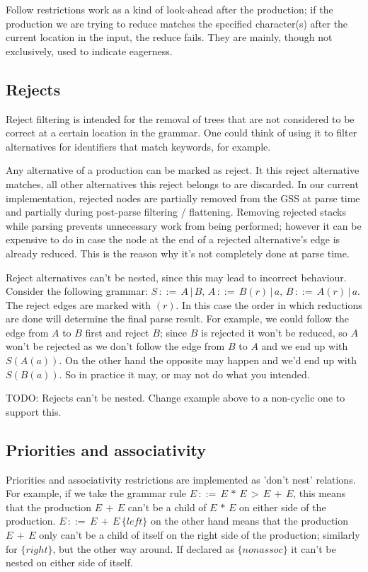 \documentclass[a4paper,10pt]{article}
\begin{document}
Follow restrictions work as a kind of look-ahead after the production; if the production we are trying to reduce matches the specified character(s) after the current location in the input, the reduce fails. They are mainly, though not exclusively, used to indicate eagerness.

\subsection{Rejects}

Reject filtering is intended for the removal of trees that are not considered to be correct at a certain location in the grammar. One could think of using it to filter alternatives for identifiers that match keywords, for example.

Any alternative of a production can be marked as reject. It this reject alternative matches, all other alternatives this reject belongs to are discarded. In our current implementation, rejected nodes are partially removed from the GSS at parse time and partially during post-parse filtering / flattening. Removing rejected stacks while parsing prevents unnecessary work from being performed; however it can be expensive to do in case the node at the end of a rejected alternative's edge is already reduced. This is the reason why it's not completely done at parse time.

Reject alternatives can't be nested, since this may lead to incorrect behaviour. Consider the following grammar: $S\,::=\,A\,|\,B,\,A\,::=\,B(r)\,|\,a,\,B\,::=\,A(r)\,|\,a$. The reject edges are marked with $(r)$. In this case the order in which reductions are done will determine the final parse result. For example, we could follow the edge from $A$ to $B$ first and reject $B$; since $B$ is rejected it won't be reduced, so $A$ won't be rejected as we don't follow the edge from $B$ to $A$ and we end up with $S(A(a))$. On the other hand the opposite may happen and we'd end up with $S(B(a))$. So in practice it may, or may not do what you intended.

TODO: Rejects can't be nested. Change example above to a non-cyclic one to support this.

\subsection{Priorities and associativity}

Priorities and associativity restrictions are implemented as 'don't nest' relations. For example, if we take the grammar rule $E\,::=\,E\,*\,E\,>\,E\,+\,E$, this means that the production $E\,+\,E$ can't be a child of $E\,*\,E$ on either side of the production. $E\,::=\,E\,+\,E\,\{left\}$ on the other hand means that the production $E\,+\,E$ only can't be a child of itself on the right side of the production; similarly for $\{right\}$, but the other way around. If declared as $\{nonassoc\}$ it can't be nested on either side of itself.
\end{document}
